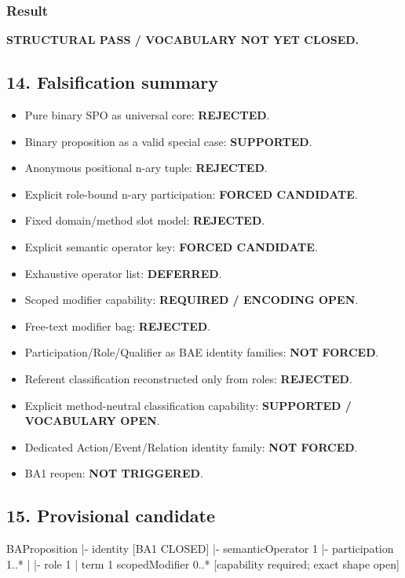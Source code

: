 \documentclass[
  10pt,
  letterpaper,
]{article}
\newenvironment{Shaded}{}{}
\newcommand{\NormalTok}[1]{#1}
\providecommand{\tightlist}{%
  \setlength{\itemsep}{0pt}\setlength{\parskip}{0pt}}
\begin{document}
\subsubsection{Result}\label{result}

\textbf{STRUCTURAL PASS / VOCABULARY NOT YET CLOSED.}

\subsection{14. Falsification summary}\label{falsification-summary}

\begin{itemize}
\tightlist
\item
  Pure binary SPO as universal core: \textbf{REJECTED}.
\item
  Binary proposition as a valid special case: \textbf{SUPPORTED}.
\item
  Anonymous positional n-ary tuple: \textbf{REJECTED}.
\item
  Explicit role-bound n-ary participation: \textbf{FORCED CANDIDATE}.
\item
  Fixed domain/method slot model: \textbf{REJECTED}.
\item
  Explicit semantic operator key: \textbf{FORCED CANDIDATE}.
\item
  Exhaustive operator list: \textbf{DEFERRED}.
\item
  Scoped modifier capability: \textbf{REQUIRED / ENCODING OPEN}.
\item
  Free-text modifier bag: \textbf{REJECTED}.
\item
  Participation/Role/Qualifier as BAE identity families: \textbf{NOT
  FORCED}.
\item
  Referent classification reconstructed only from roles:
  \textbf{REJECTED}.
\item
  Explicit method-neutral classification capability: \textbf{SUPPORTED /
  VOCABULARY OPEN}.
\item
  Dedicated Action/Event/Relation identity family: \textbf{NOT FORCED}.
\item
  BA1 reopen: \textbf{NOT TRIGGERED}.
\end{itemize}

\subsection{15. Provisional candidate}\label{provisional-candidate}

\begin{Shaded}
\begin{Highlighting}[]
\NormalTok{BAProposition}
\NormalTok{|{-} identity                         [BA1 CLOSED]}
\NormalTok{|{-} semanticOperator                1}
\NormalTok{|{-} participation                   1..*}
\NormalTok{|    |{-} role                       1}
\NormalTok{|    \textasciigrave{}{-} term                       1}
\NormalTok{\textasciigrave{}{-} scopedModifier                  0..* [capability required; exact shape open]}
\end{Highlighting}
\end{Shaded}
\end{document}
